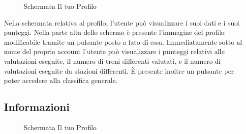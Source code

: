 \begin{figure}[htp]
    \caption{Schermata Il tuo Profilo}
    \label{fig:ilTuoProfilo}
\end{figure}

Nella schermata relativa al profilo, l'utente può visualizzare i suoi dati e i suoi punteggi. Nella parte alta dello schermo è presente l'immagine del profilo modificabile tramite un pulsante posto a lato di essa. Immediatamente sotto al nome del proprio account l'utente può visualizzare i punteggi relativi alle valutazioni eseguite, il numero di treni differenti valutati, e il numero di valutazioni eseguite da stazioni differenti. È presente inoltre un pulsante per poter accedere alla classifica generale.

\subsection{Informazioni}

\begin{figure}[htp]
	\centering
	 \quad
	\caption{Schermata Il tuo Profilo}
	\label{fig:ilTuoProfilo}
\end{figure}

